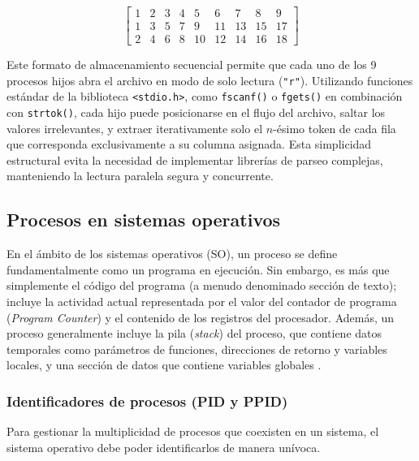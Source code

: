 \[
\begin{bmatrix}
1 & 2 & 3 & 4 & 5 & 6 & 7 & 8 & 9 \\
1 & 3 & 5 & 7 & 9 & 11 & 13 & 15 & 17 \\
2 & 4 & 6 & 8 & 10 & 12 & 14 & 16 & 18
\end{bmatrix}
\]

Este formato de almacenamiento secuencial permite que cada uno de los 9 procesos hijos abra el archivo en modo de solo lectura (\texttt{"r"}). Utilizando funciones estándar de la biblioteca \texttt{<stdio.h>}, como \texttt{fscanf()} o \texttt{fgets()} en combinación con \texttt{strtok()}, cada hijo puede posicionarse en el flujo del archivo, saltar los valores irrelevantes, y extraer iterativamente solo el $n$-ésimo token de cada fila que corresponda exclusivamente a su columna asignada. Esta simplicidad estructural evita la necesidad de implementar librerías de parseo complejas, manteniendo la lectura paralela segura y concurrente.


\subsection{Procesos en sistemas operativos}
\label{sec:prac02:procesos}

En el ámbito de los sistemas operativos (SO), un proceso se define fundamentalmente como un programa en ejecución. Sin embargo, es más que simplemente el código del programa (a menudo denominado sección de texto); incluye la actividad actual representada por el valor del contador de programa (\textit{Program Counter}) y el contenido de los registros del procesador. Además, un proceso generalmente incluye la pila (\textit{stack}) del proceso, que contiene datos temporales como parámetros de funciones, direcciones de retorno y variables locales, y una sección de datos que contiene variables globales \cite{silberschatz:os-concepts:2018}.

\subsubsection{Identificadores de procesos (PID y PPID)}

Para gestionar la multiplicidad de procesos que coexisten en un sistema, el sistema operativo debe poder identificarlos de manera unívoca.

